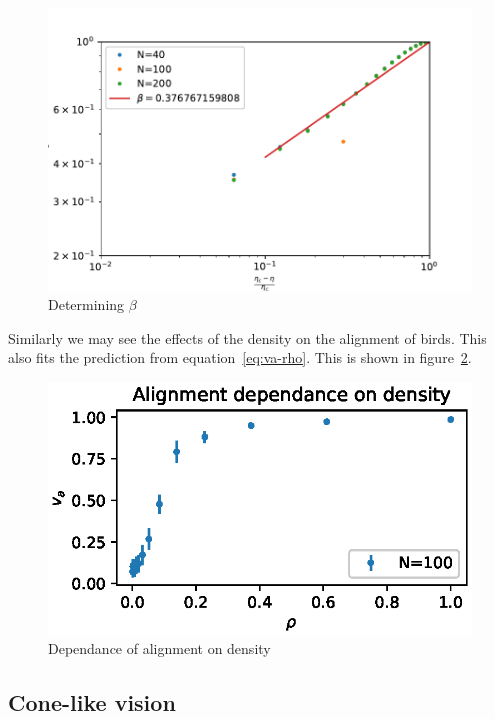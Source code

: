 \documentclass[twoside,twocolumn]{article}
\begin{document}
\begin{figure}[!htb]
	\centering
	\includegraphics[width=\columnwidth]{va_over_etac_minus_eta_over_etac}
	\caption{Determining $\beta$}\label{fig:criticaleta}
\end{figure}

Similarly we may see the effects of the density on the alignment of birds. This also fits the prediction from equation~\eqref{eq:va-rho}. This is shown in figure~\ref{fig:va_over_rho}.

\begin{figure}[!htb]
	\centering
	\includegraphics[width=\columnwidth]{va_over_rho}
	\caption{Dependance of alignment on density}\label{fig:va_over_rho}
\end{figure}

\subsection*{Cone-like vision}\label{subsec:conevision}
\end{document}
